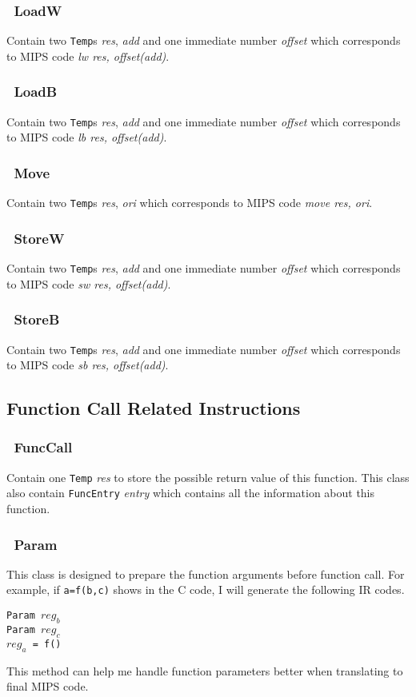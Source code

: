 \documentclass[journal]{IEEEtran}
\begin{document}
\subsubsection{\ LoadW}
Contain two \texttt{Temp}s \textit{res}, \textit{add} and one immediate number \textit{offset} which corresponds to MIPS code \textit{lw res, offset(add)}.

\subsubsection{\ LoadB}
Contain two \texttt{Temp}s \textit{res}, \textit{add} and one immediate number \textit{offset} which corresponds to MIPS code \textit{lb res, offset(add)}.

\subsubsection{\ Move}
Contain two \texttt{Temp}s \textit{res}, \textit{ori} which corresponds to MIPS code \textit{move res, ori}.

\subsubsection{\ StoreW}
Contain two \texttt{Temp}s \textit{res}, \textit{add} and one immediate number \textit{offset} which corresponds to MIPS code \textit{sw res, offset(add)}.

\subsubsection{\ StoreB}
Contain two \texttt{Temp}s \textit{res}, \textit{add} and one immediate number \textit{offset} which corresponds to MIPS code \textit{sb res, offset(add)}.

\subsection{Function Call Related Instructions}

\subsubsection{\ FuncCall}
Contain one \texttt{Temp} \textit{res} to store the possible return value of this function. This class also contain \texttt{FuncEntry} \textit{entry} which contains all the information about this function.

\subsubsection{\ Param}
This class is designed to prepare the function arguments before function call. 
For example, if \texttt{a=f(b,c)}
shows in the C code, I will generate the following IR codes.
\begin{center}
\texttt{Param $reg_b$}  \\
\texttt{Param $reg_c$} \\
\texttt{$reg_a$ = f()} 
\end{center}
This method can help me handle function parameters better when translating to final MIPS code.
\end{document}
